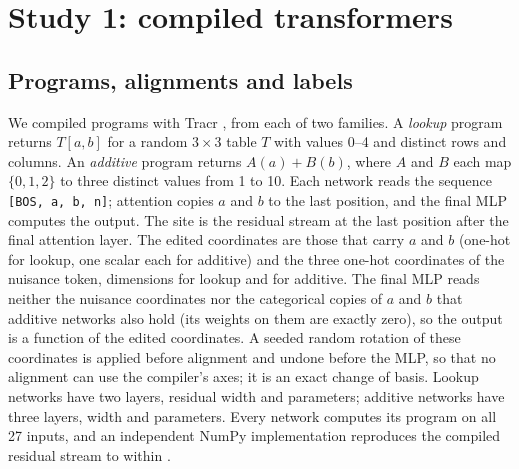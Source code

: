 \section{Study 1: compiled transformers}\label{sec:compiled}

\subsection{Programs, alignments and labels}

We compiled \CmpPrograms{} programs with Tracr \citep{lindner2023tracr}, \CmpPerFamily{} from each of two
families. A \emph{lookup} program returns $T[a,b]$ for a random $3\times3$ table $T$ with values 0--4 and
distinct rows and columns. An \emph{additive} program returns $A(a)+B(b)$, where $A$ and $B$ each map $\{0,1,2\}$
to three distinct values from 1 to 10. Each network reads the sequence \texttt{[BOS, a, b, n]}; attention copies
$a$ and $b$ to the last position, and the final MLP computes the output. The site is the residual stream at the
last position after the final attention layer. The edited coordinates are those that carry $a$ and $b$ (one-hot
for lookup, one scalar each for additive) and the three one-hot coordinates of the nuisance token, \CmpPoolLookup{}
dimensions for lookup and \CmpPoolAdditive{} for additive. The final MLP reads neither the nuisance coordinates nor
the categorical copies of $a$ and $b$ that additive networks also hold (its weights on them are exactly zero), so
the output is a function of the edited coordinates. A seeded random rotation of these coordinates is applied before
alignment and undone before the MLP, so that no alignment can use the compiler's axes; it is an exact change of
basis. Lookup networks have two layers, residual width \CmpResidLookup{} and \CmpParamsLookup{} parameters;
additive networks have three layers, width \CmpResidAdditive{} and \CmpParamsAdditive{} parameters. Every network
computes its program on all 27 inputs, and an independent NumPy implementation reproduces the compiled residual
stream to within \CmpNativeMax.

